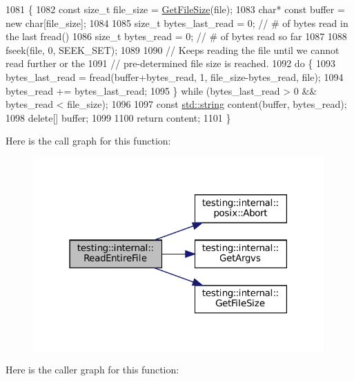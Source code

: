 \begin{DoxyCode}
1081                                      \{
1082   \textcolor{keyword}{const} \textcolor{keywordtype}{size\_t} file\_size = \hyperlink{namespacetesting_1_1internal_a06ca3f65f5e85c9ce7299b9e4cd52408}{GetFileSize}(file);
1083   \textcolor{keywordtype}{char}* \textcolor{keyword}{const} buffer = \textcolor{keyword}{new} \textcolor{keywordtype}{char}[file\_size];
1084 
1085   \textcolor{keywordtype}{size\_t} bytes\_last\_read = 0;  \textcolor{comment}{// # of bytes read in the last fread()}
1086   \textcolor{keywordtype}{size\_t} bytes\_read = 0;       \textcolor{comment}{// # of bytes read so far}
1087 
1088   fseek(file, 0, SEEK\_SET);
1089 
1090   \textcolor{comment}{// Keeps reading the file until we cannot read further or the}
1091   \textcolor{comment}{// pre-determined file size is reached.}
1092   \textcolor{keywordflow}{do} \{
1093     bytes\_last\_read = fread(buffer+bytes\_read, 1, file\_size-bytes\_read, file);
1094     bytes\_read += bytes\_last\_read;
1095   \} \textcolor{keywordflow}{while} (bytes\_last\_read > 0 && bytes\_read < file\_size);
1096 
1097   \textcolor{keyword}{const} \hyperlink{namespacetesting_1_1internal_a8e8ff5b11e64078831112677156cb111}{std::string} content(buffer, bytes\_read);
1098   \textcolor{keyword}{delete}[] buffer;
1099 
1100   \textcolor{keywordflow}{return} content;
1101 \}
\end{DoxyCode}
Here is the call graph for this function\+:
\nopagebreak
\begin{figure}[H]
\begin{center}
\leavevmode
\includegraphics[width=316pt]{namespacetesting_1_1internal_a2cc0be60c54a8701423fe5297e1349ee_cgraph}
\end{center}
\end{figure}
Here is the caller graph for this function\+:
\nopagebreak
